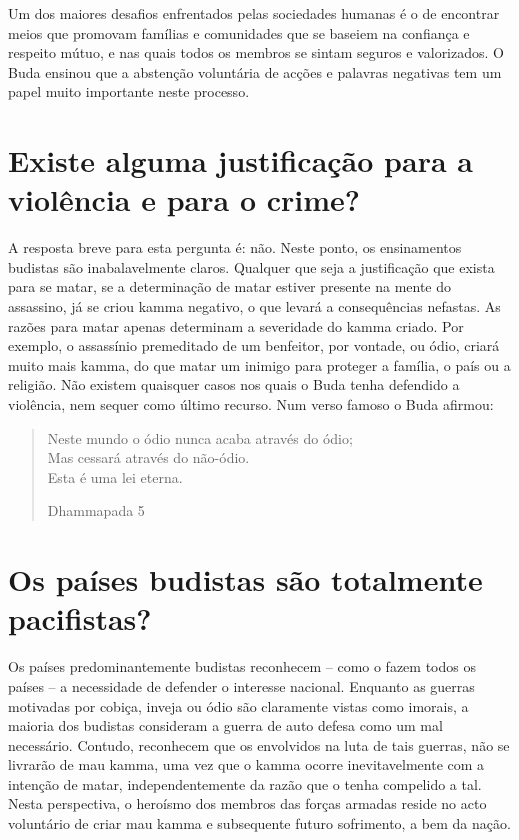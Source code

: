 Um dos maiores desafios enfrentados pelas sociedades humanas é o de
encontrar meios que promovam famílias e comunidades que se baseiem na
confiança e respeito mútuo, e nas quais todos os membros se sintam
seguros e valorizados. O Buda ensinou que a abstenção voluntária de
acções e palavras negativas tem um papel muito importante neste
processo.

\section{Existe alguma justificação para a violência e para o crime?}

A resposta breve para esta pergunta é: não. Neste ponto, os ensinamentos
budistas são inabalavelmente claros. Qualquer que seja a justificação
que exista para se matar, se a determinação de matar estiver presente na
mente do assassino, já se criou kamma negativo, o que levará a
consequências nefastas. As razões para matar apenas determinam a
severidade do kamma criado. Por exemplo, o assassínio premeditado de um
benfeitor, por vontade, ou ódio, criará muito mais kamma, do que matar
um inimigo para proteger a família, o país ou a religião. Não existem
quaisquer casos nos quais o Buda tenha defendido a violência, nem sequer
como último recurso. Num verso famoso o Buda afirmou:

\begin{verse}
  Neste mundo o ódio nunca acaba através do ódio;\\
  Mas cessará através do não-ódio.\\
  Esta é uma lei eterna.

  Dhammapada 5
\end{verse}

\section{Os países budistas são totalmente pacifistas?}

Os países predominantemente budistas reconhecem -- como o fazem todos os
países -- a necessidade de defender o interesse nacional. Enquanto as
guerras motivadas por cobiça, inveja ou ódio são claramente vistas como
imorais, a maioria dos budistas consideram a guerra de auto defesa como
um mal necessário. Contudo, reconhecem que os envolvidos na luta de tais
guerras, não se livrarão de mau kamma, uma vez que o kamma ocorre
inevitavelmente com a intenção de matar, independentemente da razão que
o tenha compelido a tal. Nesta perspectiva, o heroísmo dos membros das
forças armadas reside no acto voluntário de criar mau kamma e
subsequente futuro sofrimento, a bem da nação.


